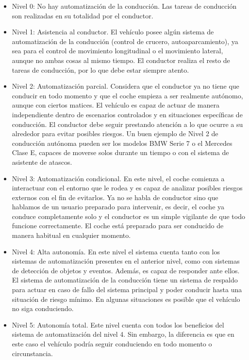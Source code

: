 \begin{itemize}
    \item Nivel 0: No hay automatización de la conducción. Las tareas de conducción son realizadas en su totalidad por el conductor.
    
    \item Nivel 1: Asistencia al conductor. El vehículo posee algún sistema de automatización de la conducción (control de crucero, autoaparcamiento), ya sea para el control de movimiento longitudinal o el movimiento lateral, aunque no ambas cosas al mismo tiempo. El conductor realiza el resto de tareas de conducción, por lo que debe estar siempre atento.
    
    \item Nivel 2: Automatización parcial. Considera que el conductor ya no tiene que conducir en todo momento y que el coche empieza a ser realmente autónomo, aunque con ciertos matices. El vehículo es capaz de actuar de manera independiente dentro de escenarios controlados y en situaciones específicas de conducción. El conductor debe seguir prestando atención a lo que ocurre a su alrededor para evitar posibles riesgos. Un buen ejemplo de Nivel 2 de conducción autónoma pueden ser los modelos BMW Serie 7 o el Mercedes Clase E, capaces de moverse solos durante un tiempo o con el sistema de asistente de atascos.
    
    \item Nivel 3: Automatización condicional. En este nivel, el coche comienza a interactuar con el entorno que le rodea y es capaz de analizar posibles riesgos externos con el fin de evitarlos. Ya no se habla de conductor sino que hablamos de un usuario preparado para intervenir, es decir, el coche ya conduce completamente solo y el conductor es un simple vigilante de que todo funcione correctamente. El coche está preparado para ser conducido de manera habitual en cualquier momento.
    
    \item Nivel 4: Alta autonomía. En este nivel el sistema cuenta tanto con los sistemas de automatización presentes en el anterior nivel, como con sistemas de detección de objetos y eventos. Además, es capaz de responder ante ellos. El sistema de automatización de la conducción tiene un sistema de respaldo para actuar en caso de fallo del sistema principal y poder conducir hasta una situación de riesgo mínimo. En algunas situaciones es posible que el vehículo no siga conduciendo.
    
    \item Nivel 5: Autonomía total. Este nivel cuenta con todos los beneficios del sistema de automatización del nivel 4. Sin embargo, la diferencia es que en este caso el vehículo podría seguir conduciendo en todo momento o circunstancia.
\end{itemize}

